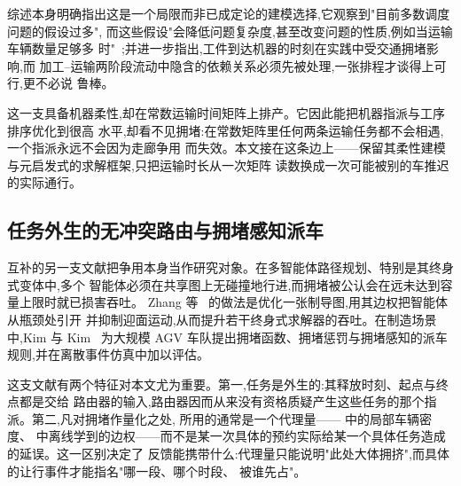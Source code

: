 \documentclass[manuscript,screen,review]{acmart}
\begin{document}
综述本身明确指出这是一个局限而非已成定论的建模选择,它观察到"目前多数调度问题的假设过多",
而这些假设"会降低问题复杂度,甚至改变问题的性质,例如当运输车辆数量足够多
时"~\cite{xin2025review};并进一步指出,工件到达机器的时刻在实践中受交通拥堵影响,而
加工--运输两阶段流动中隐含的依赖关系必须先被处理,一张排程才谈得上可行,更不必说
鲁棒。

这一支具备机器柔性,却在常数运输时间矩阵上排产。它因此能把机器指派与工序排序优化到很高
水平,却看不见拥堵:在常数矩阵里任何两条运输任务都不会相遇,一个指派永远不会因为走廊争用
而失效。本文接在这条边上——保留其柔性建模与元启发式的求解框架,只把运输时长从一次矩阵
读数换成一次可能被别的车推迟的实际通行。

\subsection{任务外生的无冲突路由与拥堵感知派车}

互补的另一支文献把争用本身当作研究对象。在多智能体路径规划、特别是其终身式变体中,多个
智能体必须在共享图上无碰撞地行进,而拥堵被公认会在远未达到容量上限时就已损害吞吐。
Zhang 等~\cite{zhang2024guidance} 的做法是优化一张制导图,用其边权把智能体从瓶颈处引开
并抑制迎面运动,从而提升若干终身式求解器的吞吐。在制造场景中,Kim 与
Kim~\cite{kim2026congestion} 为大规模 AGV 车队提出拥堵函数、拥堵惩罚与拥堵感知的派车
规则,并在离散事件仿真中加以评估。

这支文献有两个特征对本文尤为重要。第一,任务是外生的:其释放时刻、起点与终点都是交给
路由器的输入,路由器因而从来没有资格质疑产生这些任务的那个指派。第二,凡对拥堵作量化之处,
所用的通常是一个代理量——\cite{kim2026congestion} 中的局部车辆密度、\cite{zhang2024guidance}
中离线学到的边权——而不是某一次具体的预约实际给某一个具体任务造成的延误。这一区别决定了
反馈能携带什么:代理量只能说明"此处大体拥挤",而具体的让行事件才能指名"哪一段、哪个时段、
被谁先占"。
\end{document}
